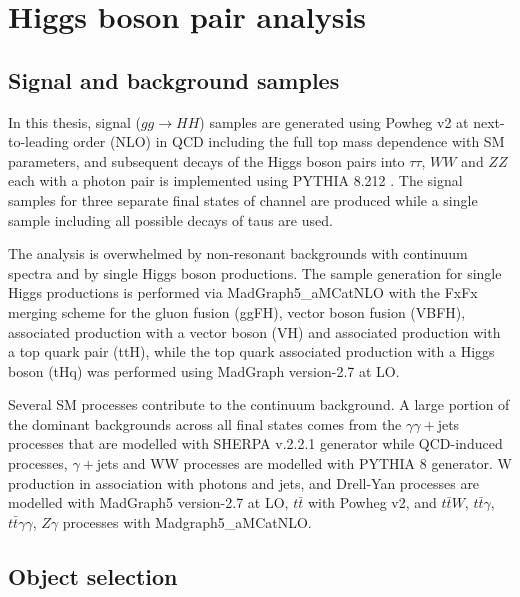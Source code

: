 {\section{Higgs boson pair analysis}



\subsection{Signal and background samples}\label{samples_section}

In this thesis, signal ($gg \rightarrow HH$) samples are generated using Powheg v2 \cite{Nason2004, Frixione2007, Alioli2010, Heinrich2019} at next-to-leading order (NLO) in QCD including the full top mass dependence with SM parameters, and subsequent decays of the Higgs boson pairs into $\tau\tau$, $WW$ and $ZZ$ each with a photon pair is implemented using PYTHIA 8.212 \cite{Sjstrand2015}. The signal samples for three separate final states of \wwgg channel are produced while a single sample including all possible decays of taus are used.

The analysis is overwhelmed by non-resonant backgrounds with continuum \mgg spectra and by single Higgs boson productions. The sample generation for single Higgs productions is performed via MadGraph5\_aMCatNLO \cite{Alwall2014, Artoisenet2013} with the FxFx merging scheme \cite{Frederix2012} for the gluon fusion (ggFH), vector boson fusion (VBFH), associated production with a vector boson (VH) and associated production with a top quark pair (ttH), while the top quark associated production  with a Higgs boson (tHq) was performed using MadGraph version-2.7 at LO.

Several SM processes contribute to the continuum background. A large portion of the dominant backgrounds across all final states comes from the $\gamma\gamma+$jets processes that are modelled with SHERPA v.2.2.1 generator \cite{10.21468/SciPostPhys.7.3.034} while QCD-induced processes, $\gamma+$jets and WW processes are modelled with PYTHIA 8 generator. W production in association with photons and jets, and Drell-Yan processes are modelled with MadGraph5 version-2.7 at LO, $t\bar t$ with Powheg v2, and $t\bar tW$, $t\bar t\gamma$, $t\bar t\gamma\gamma$, $Z\gamma$ processes with Madgraph5\_aMCatNLO.

\subsection{Object selection}

}

